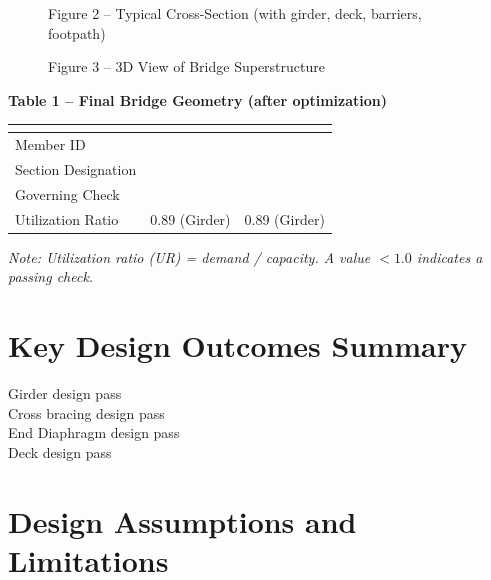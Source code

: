 \documentclass[12pt,a4paper]{report}
\numberwithin{table}{chapter}
\numberwithin{figure}{chapter}
\begin{document}
\begin{figure}[H]
\centering
{}
\caption*{Figure 2 -- Typical Cross-Section (with girder, deck, barriers, footpath)}
\end{figure}

\begin{figure}[H]
\centering
{}
\caption*{Figure 3 -- 3D View of Bridge Superstructure}
\end{figure}

\noindent\textbf{Table 1 -- Final Bridge Geometry (after optimization)}

\vspace{0.4em}
\noindent
\begin{tabular}{|C{2.8cm}|C{6.1cm}|C{6.1cm}|}
\hline
  \textbf{} &
  \textbf{} &
  \textbf{} \\
\hline
Member ID &  &  \\
\hline
Section Designation &  &  \\
\hline
Governing Check &  &  \\
\hline
Utilization Ratio & 0.89 (Girder) & 0.89 (Girder) \\
\hline
\end{tabular}

\vspace{0.4em}
\noindent\textit{Note: Utilization ratio (UR) = demand / capacity. A value $< 1.0$ indicates a passing check.}

\vspace{1em}

\section*{Key Design Outcomes Summary}
\label{sec:key-outcomes}

\noindent Girder design pass \\
Cross bracing design pass \\
End Diaphragm design pass \\
Deck design pass

\section*{Design Assumptions and Limitations}
\label{sec:assumptions}
\end{document}
